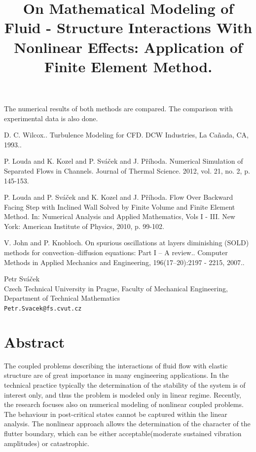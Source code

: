 \documentclass[article, A4, 11pt]{llncs}%
\begin{document}
The numerical results of both methods are compared. The comparison with experimental data is also done.



\begin{thebibliography}{10}
{\sc D. C. Wilcox.}. {Turbulence Modeling for CFD}. DCW Industries, La Ca\~{n}ada, CA, 1993..

{\sc P. Louda and K. Kozel and P. Sváček and J. Příhoda}. {Numerical Simulation of Separated Flows in Channels}. Journal of Thermal Science. 2012, vol. 21, no. 2, p. 145-153.

{\sc P. Louda and P. Sváček and K. Kozel and J. Příhoda}. { Flow Over Backward Facing Step with Inclined Wall Solved by Finite Volume and Finite Element Method}. In: Numerical Analysis and Applied Mathematics, Vols I - III. New York: American Institute of Physics, 2010, p. 99-102.

{\sc V. John and P. Knobloch}. {On spurious oscillations at layers diminishing (SOLD) methods for convection–diffusion equations: Part I – A review.}. Computer Methods in Applied Mechanics and Engineering, 196(17–20):2197 - 2215, 2007..
\end{thebibliography} %

\title{On Mathematical Modeling of Fluid - Structure Interactions With Nonlinear Effects: Application of Finite Element Method.}
 \author{} \institute{}
\maketitle
\begin{center}
{\large Petr  Sváček}\\
Czech Technical University in Prague, Faculty of Mechanical Engineering, Department of Technical Mathematics\\
{\tt Petr.Svacek@fs.cvut.cz}
\end{center}

\section*{Abstract}
The coupled problems describing the interactions of fluid flow with elastic structure are of great importance in many engineering applications. In the technical practice typically the determination of the stability of the system is of interest only, and thus the problem is modeled only in linear regime. Recently, the research focuses also on numerical modeling of nonlinear coupled problems. The behaviour in post-critical states cannot be captured within the linear analysis. The nonlinear approach allows the determination of the character of the flutter boundary, which can be either acceptable(moderate sustained vibration amplitudes) or catastrophic.
\end{document}
